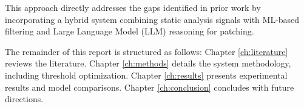 This approach directly addresses the gaps identified in prior work by incorporating 
a hybrid system combining static analysis signals with ML-based filtering and Large 
Language Model (LLM) reasoning for patching.

The remainder of this report is structured as follows:
Chapter \ref{ch:literature} reviews the literature.
Chapter \ref{ch:methods} details the system methodology, including threshold optimization.
Chapter \ref{ch:results} presents experimental results and model comparisons.
Chapter \ref{ch:conclusion} concludes with future directions.

